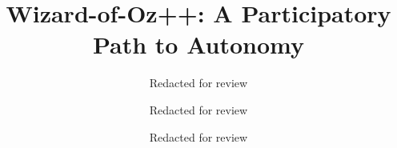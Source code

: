 \documentclass[manuscript, review, anonymous]{acmart}
\begin{document}
    \title{Wizard-of-Oz++: A Participatory Path to Autonomy}

\author{Redacted for review}
\email{************}
\affiliation{%
  \institution{********}
  \state{****}
  }
  
  \author{Redacted for review}
\email{************}
\affiliation{%
  \institution{********}
  \state{****}
  }
  
  \author{Redacted for review}
\email{************}
\affiliation{%
  \institution{********}
  \state{****}
  }
\end{document}

